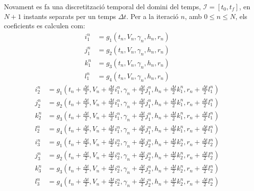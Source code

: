 Novament es fa una discretització temporal del domini del temps, $\mathcal{I} = \left[ t_0, t_f \right]$, en $N+1$ instants separats per un temps $\Delta t$. Per a la iteració $n$, amb $0 \leq n \leq N$, els coeficients es calculen com:
\begin{align}
    i_1^n &= g_1 \left( t_n, V_n, \gamma_n, h_n, r_n \right) \\
    j_1^n &= g_2 \left( t_n, V_n, \gamma_n, h_n, r_n \right) \\
    k_1^n &= g_3 \left( t_n, V_n, \gamma_n, h_n, r_n \right) \\
    l_1^n &= g_4 \left( t_n, V_n, \gamma_n, h_n, r_n \right) 
\end{align}
\begin{align}
    i_2^n &= g_1 \left( t_n + \frac{\Delta t}{2}, V_n + \frac{\Delta t}{2} i_1^n, 
    \gamma_n + \frac{\Delta t}{2} j_1^n, h_n + \frac{\Delta t}{2} k_1^n, r_n + \frac{\Delta t}{2} l_1^n \right) \\
    j_2^n &= g_2 \left( t_n + \frac{\Delta t}{2}, V_n + \frac{\Delta t}{2} i_1^n, 
    \gamma_n + \frac{\Delta t}{2} j_1^n, h_n + \frac{\Delta t}{2} k_1^n, r_n + \frac{\Delta t}{2} l_1^n \right) \\
    k_2^n &= g_3 \left( t_n + \frac{\Delta t}{2}, V_n + \frac{\Delta t}{2} i_1^n, 
    \gamma_n + \frac{\Delta t}{2} j_1^n, h_n + \frac{\Delta t}{2} k_1^n, r_n + \frac{\Delta t}{2} l_1^n \right) \\
    l_2^n &= g_4 \left( t_n + \frac{\Delta t}{2}, V_n + \frac{\Delta t}{2} i_1^n, 
    \gamma_n + \frac{\Delta t}{2} j_1^n, h_n + \frac{\Delta t}{2} k_1^n, r_n + \frac{\Delta t}{2} l_1^n \right)
\end{align}
\begin{align}
    i_3^n &= g_1 \left( t_n + \frac{\Delta t}{2}, V_n + \frac{\Delta t}{2} i_2^n, 
    \gamma_n + \frac{\Delta t}{2} j_2^n, h_n + \frac{\Delta t}{2} k_2^n, r_n + \frac{\Delta t}{2} l_2^n \right) \\
    j_3^n &= g_2 \left( t_n + \frac{\Delta t}{2}, V_n + \frac{\Delta t}{2} i_2^n, 
    \gamma_n + \frac{\Delta t}{2} j_2^n, h_n + \frac{\Delta t}{2} k_2^n, r_n + \frac{\Delta t}{2} l_2^n \right) \\
    k_3^n &= g_3 \left( t_n + \frac{\Delta t}{2}, V_n + \frac{\Delta t}{2} i_2^n, 
    \gamma_n + \frac{\Delta t}{2} j_2^n, h_n + \frac{\Delta t}{2} k_2^n, r_n + \frac{\Delta t}{2} l_2^n \right) \\
    l_3^n &= g_4 \left( t_n + \frac{\Delta t}{2}, V_n + \frac{\Delta t}{2} i_2^n, 
    \gamma_n + \frac{\Delta t}{2} j_2^n, h_n + \frac{\Delta t}{2} k_2^n, r_n + \frac{\Delta t}{2} l_2^n \right)
\end{align}
